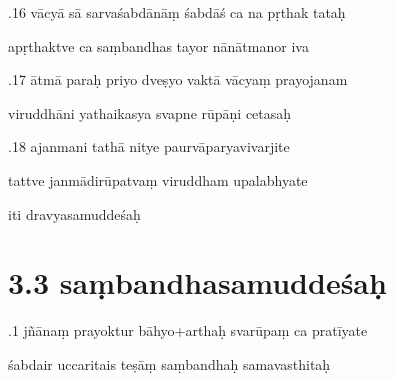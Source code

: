 \documentclass[article,12pt,a4paper]{memoir}%
\newcounter{parCount}
\begin{document}
	  
	  \pstart {}.16 vācyā sā sarvaśabdānāṃ śabdāś ca na pṛthak tataḥ 
	{}
	\pend%
      

	  
	  \pstart \leavevmode%
	apṛthaktve ca saṃbandhas tayor nānātmanor iva 
	{}
	\pend%
      

	  
	  \pstart {}.17 ātmā paraḥ priyo dveṣyo vaktā vācyaṃ prayojanam 
	{}
	\pend%
      

	  
	  \pstart \leavevmode%
	viruddhāni yathaikasya svapne rūpāṇi cetasaḥ 
	{}
	\pend%
      

	  
	  \pstart {}.18 ajanmani tathā nitye paurvāparyavivarjite 
	{}
	\pend%
      

	  
	  \pstart \leavevmode%
	tattve janmādirūpatvaṃ viruddham upalabhyate 
	{}
	\pend%
      

	  
	  \pstart \leavevmode%
	iti dravyasamuddeśaḥ
	{}
	\pend%
      
	  
	
\chapter[{3.3 saṃbandhasamuddeśaḥ}][{3.3 saṃbandhasamuddeśaḥ}]{ 3.3 saṃbandhasamuddeśaḥ}

	  
	  \pstart {}.1 jñānaṃ prayoktur bāhyo+arthaḥ svarūpaṃ ca pratīyate 
	{}
	\pend%
      

	  
	  \pstart \leavevmode%
	śabdair uccaritais teṣāṃ saṃbandhaḥ samavasthitaḥ 
	{}
	\pend%
      
\end{document}
